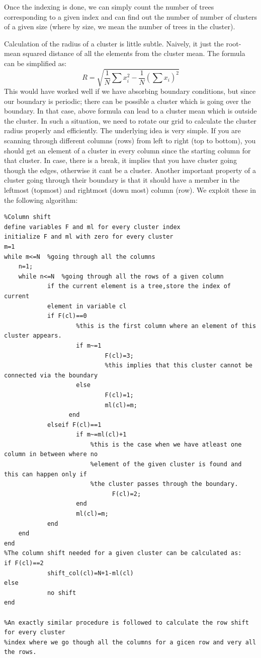 \documentclass[11pt]{article}
\def \beq{\begin{equation}}
\def \eeq{\end{equation}}
\def \beq{\begin{equation}}
\def \eeq{\end{equation}}
\begin{document}
Once the indexing is done, we can simply count the number of trees corresponding to a given index and can find out the number of number of clusters of a given size (where by size, we mean the number of trees in the cluster).

Calculation of the radius of a cluster is little subtle. Naively, it just the root-mean squared distance of all the elements from the cluster mean. The formula can be simplified as:
\beq
R=\sqrt{\frac{1}{N}\sum{x_{i}^{2}}-\frac{1}{N}(\sum{x_{i}})^2}
\eeq  
This would have worked well if we have absorbing boundary conditions, but since our boundary is periodic; there can be possible a cluster which is going over the boundary. In that case, above formula can lead to a cluster mean which is outside the cluster. In such a situation, we need to rotate our grid to calculate the cluster radius properly and efficiently. The underlying idea is very simple. If you are scanning through different columns (rows) from left to right (top to bottom), you should get an element of a cluster in every column since the starting column for that cluster. In case, there is a break, it implies that you have cluster going though the edges, otherwise it cant be a cluster. Another important property of a cluster going through their boundary is that it should have a member in the leftmost (topmost) and rightmost (down most) column (row). We exploit these in the following algorithm:\\

\begin{verbatim}
%Column shift
define variables F and ml for every cluster index
initialize F and ml with zero for every cluster
m=1
while m<=N  %going through all the columns
	n=1;
	while n<=N  %going through all the rows of a given column
			if the current element is a tree,store the index of current 
			element in variable cl
			if F(cl)==0
					%this is the first column where an element of this cluster appears.
					if m~=1
							F(cl)=3;
							%this implies that this cluster cannot be connected via the boundary
					else
							F(cl)=1;
							ml(cl)=m;
				  end
			elseif F(cl)==1
					if m~=ml(cl)+1
						%this is the case when we have atleast one column in between where no
						%element of the given cluster is found and this can happen only if
						%the cluster passes through the boundary.
							  F(cl)=2;
					end		  
					ml(cl)=m;
			end
	end
end			
%The column shift needed for a given cluster can be calculated as:
if F(cl)==2
			shift_col(cl)=N+1-ml(cl)
else
			no shift
end									  

%An exactly similar procedure is followed to calculate the row shift for every cluster 
%index where we go though all the columns for a gicen row and very all the rows.

\end{verbatim}
\end{document}
